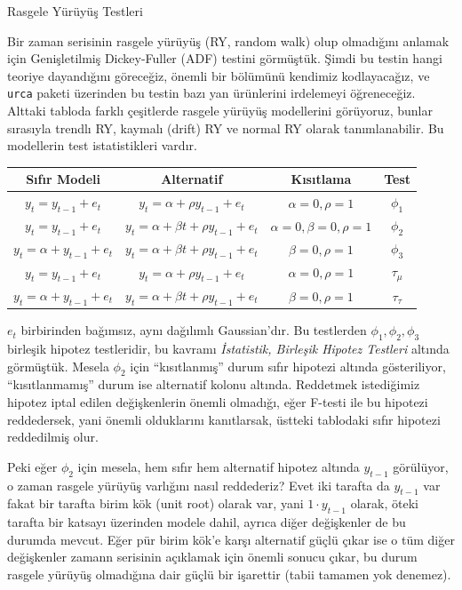 \documentclass[12pt,fleqn]{article}\usepackage{../../common}
\begin{document}
Rasgele Yürüyüş Testleri

Bir zaman serisinin rasgele yürüyüş (RY, random walk) olup olmadığını
anlamak için Genişletilmiş Dickey-Fuller (ADF) testini görmüştük. Şimdi bu
testin hangi teoriye dayandığını göreceğiz, önemli bir bölümünü kendimiz
kodlayacağız, ve \verb!urca! paketi üzerinden bu testin bazı yan ürünlerini
irdelemeyi öğreneceğiz. Alttaki tabloda farklı çeşitlerde rasgele yürüyüş
modellerini görüyoruz, bunlar sırasıyla trendlı RY, kaymalı (drift) RY ve
normal RY olarak tanımlanabilir. Bu modellerin test istatistikleri vardır.

\begin{tabular}{|c|c|c|c|}
\hline 
Sıfır Modeli & Alternatif & Kısıtlama & Test \\
\hline 
$y_t = y_{t-1} + e_t$ & 
$y_t = \alpha + \rho y_{t-1} + e_t$ & 
$\alpha=0,\rho=1$ &
$\phi_1$ \\
\hline   
$y_t = y_{t-1} + e_t$ & 
$y_t = \alpha + \beta t + \rho y_{t-1} + e_t$ & 
$\alpha=0,\beta=0,\rho=1$ &
$\phi_2$ \\
\hline   
$y_t = \alpha + y_{t-1} + e_t$ & 
$y_t = \alpha + \beta t + \rho y_{t-1} + e_t$ & 
$\beta=0,\rho=1$ &
$\phi_3$ \\
\hline   
$y_t =  y_{t-1} + e_t$ & 
$y_t = \alpha + \rho y_{t-1} + e_t$ & 
$\alpha = 0,\rho=1$ &
$\tau_\mu$ \\
\hline   
$y_t =  \alpha + y_{t-1} + e_t$ & 
$y_t = \alpha + \beta t + \rho y_{t-1} + e_t$ & 
$\beta = 0,\rho=1$ &
$\tau_\tau$ \\
\hline   
\end{tabular}


$e_t$ birbirinden bağımsız, aynı dağılımlı Gaussian'dır. Bu testlerden
$\phi_1,\phi_2,\phi_3$ birleşik hipotez testleridir, bu kavramı {\em
  İstatistik, Birleşik Hipotez Testleri} altında görmüştük. Mesela $\phi_2$
için ``kısıtlanmış'' durum sıfır hipotezi altında gösteriliyor,
``kısıtlanmamış'' durum ise alternatif kolonu altında. Reddetmek
istediğimiz hipotez iptal edilen değişkenlerin önemli olmadığı, eğer
F-testi ile bu hipotezi reddedersek, yani önemli olduklarını kanıtlarsak,
üstteki tablodaki sıfır hipotezi reddedilmiş olur.

Peki eğer $\phi_2$ için mesela, hem sıfır hem alternatif hipotez altında
$y_{t-1}$ görülüyor, o zaman rasgele yürüyüş varlığını nasıl reddederiz?
Evet iki tarafta da $y_{t-1}$ var fakat bir tarafta birim kök (unit root)
olarak var, yani $1 \cdot y_{t-1}$ olarak, öteki tarafta bir katsayı
üzerinden modele dahil, ayrıca diğer değişkenler de bu durumda mevcut. Eğer
pür birim kök'e karşı alternatif güçlü çıkar ise o tüm diğer değişkenler
zamann serisinin açıklamak için önemli sonucu çıkar, bu durum rasgele
yürüyüş olmadığına dair güçlü bir işarettir (tabii tamamen yok denemez).
\end{document}
